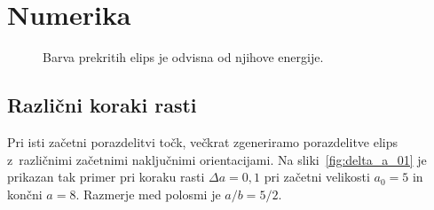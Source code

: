 \section{Numerika}
\begin{figure}[!ht]
    \centering
    \resizebox{.6\textwidth}{!}{}
    \caption{Barva prekritih elips je odvisna od njihove energije.}
    \label{fig:energija}
\end{figure}
\subsection{Različni koraki rasti}
Pri isti začetni porazdelitvi točk, večkrat zgeneriramo porazdelitve elips z~različnimi
začetnimi naključnimi orientacijami. Na sliki~\ref{fig:delta_a_01} je prikazan tak primer
pri koraku rasti $\Delta a = 0,1$ pri začetni velikosti $a_0 = 5$ in končni $a = 8$. 
Razmerje med polosmi je $a/b = 5/2$.
